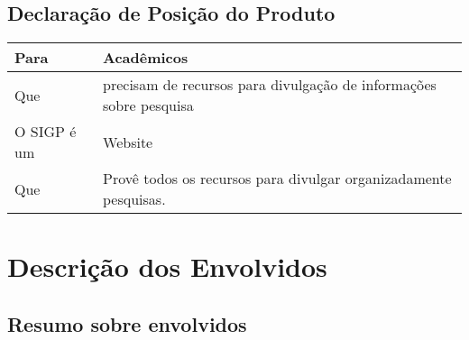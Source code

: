\documentclass[11pt, a4paper]{article}
\begin{document}
        \subsection{Declaração de Posição do Produto}
            \begin{tabular}{| l | l |}
                \hline                       
                Para & Acadêmicos \\ \hline
                Que  & precisam de recursos para divulgação de informações sobre pesquisa \\ \hline
                O SIGP é um & Website \\ \hline
                Que & Provê todos os recursos para divulgar organizadamente pesquisas. \\
                \hline
            \end{tabular}
    \section{Descrição dos Envolvidos}

\subsection{Resumo sobre envolvidos}
\end{document}
